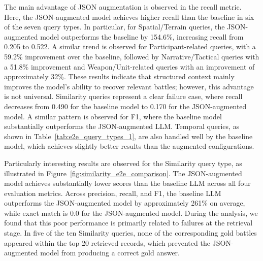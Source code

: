 The main advantage of JSON augmentation is observed in the recall metric. Here, the JSON-augmented model achieves higher recall than the baseline in six of the seven query types. In particular, for Spatial/Terrain queries, the JSON-augmented model outperforms the baseline by 154.6\%, increasing recall from 0.205 to 0.522. A similar trend is observed for Participant-related queries, with a 59.2\% improvement over the baseline, followed by Narrative/Tactical queries with a 51.8\% improvement and Weapon/Unit-related queries with an improvement of approximately 32\%. These results indicate that structured context mainly improves the model’s ability to recover relevant battles; however, this advantage is not universal. Similarity queries represent a clear failure case, where recall decreases from 0.490 for the baseline model to 0.170 for the JSON-augmented model. A similar pattern is observed for F1, where the baseline model substantially outperforms the JSON-augmented LLM. Temporal queries, as shown in Table~\ref{tab:e2e_query_types_1}, are also handled well by the baseline model, which achieves slightly better results than the augmented configurations.

Particularly interesting results are observed for the Similarity query type, as illustrated in Figure~\ref{fig:similarity_e2e_comparison}. The JSON-augmented model achieves substantially lower scores than the baseline LLM across all four evaluation metrics. Across precision, recall, and F1, the baseline LLM outperforms the JSON-augmented model by approximately 261\% on average, while exact match is 0.0 for the JSON-augmented model. During the analysis, we found that this poor performance is primarily related to failures at the retrieval stage. In five of the ten Similarity queries, none of the corresponding gold battles appeared within the top 20 retrieved records, which prevented the JSON-augmented model from producing a correct gold answer.

